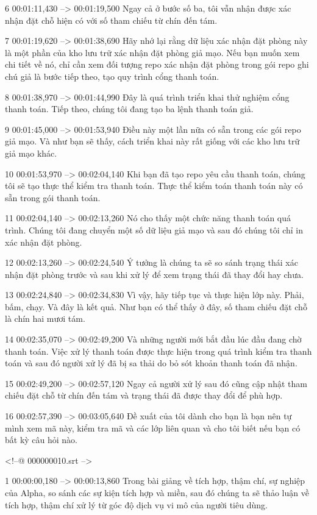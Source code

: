 6
00:01:11,430 --> 00:01:19,500
Ngay cả ở bước số ba, tôi vẫn nhận được xác nhận đặt chỗ hiện có với số tham chiếu từ chín đến tám.

7
00:01:19,620 --> 00:01:38,690
Hãy nhớ lại rằng dữ liệu xác nhận đặt phòng này là một phần của kho lưu trữ xác nhận đặt phòng giả mạo.  Nếu bạn muốn xem chi tiết về nó, chỉ cần xem đối tượng repo xác nhận đặt phòng trong gói repo ghi chú giả là bước tiếp theo, tạo quy trình cổng thanh toán.

8
00:01:38,970 --> 00:01:44,990
Đây là quá trình triển khai thử nghiệm cổng thanh toán.  Tiếp theo, chúng tôi đang tạo ba lệnh thanh toán giả.

9
00:01:45,000 --> 00:01:53,940
Điều này một lần nữa có sẵn trong các gói repo giả mạo.  Và như bạn sẽ thấy, cách triển khai này rất giống với các kho lưu trữ giả mạo khác.

10
00:01:53,970 --> 00:02:04,140
Khi bạn đã tạo repo yêu cầu thanh toán, chúng tôi sẽ tạo thực thể kiểm tra thanh toán.  Thực thể kiểm toán thanh toán này có sẵn trong gói thanh toán.

11
00:02:04,140 --> 00:02:13,260
Nó cho thấy một chức năng thanh toán quá trình.  Chúng tôi đang chuyển một số dữ liệu giả mạo và sau đó chúng tôi chỉ in xác nhận đặt phòng.

12
00:02:13,260 --> 00:02:24,540
Ý tưởng là chúng ta sẽ so sánh trạng thái xác nhận đặt phòng trước và sau khi xử lý để xem trạng thái đã thay đổi hay chưa.

13
00:02:24,840 --> 00:02:34,830
Vì vậy, hãy tiếp tục và thực hiện lớp này.  Phải, bấm, chạy.  Và đây là kết quả.  Như bạn có thể thấy ở đây, số tham chiếu đặt chỗ là chín hai mươi tám.

14
00:02:35,070 --> 00:02:49,200
Và những người mới bắt đầu lúc đầu đang chờ thanh toán.  Việc xử lý thanh toán được thực hiện trong quá trình kiểm tra thanh toán và sau đó người xử lý đã bị sa thải do bỏ sót khoản thanh toán đã nhận.

15
00:02:49,200 --> 00:02:57,120
Ngay cả người xử lý sau đó cũng cập nhật tham chiếu đặt chỗ từ chín đến tám và trạng thái đã được thay đổi để phù hợp.

16
00:02:57,390 --> 00:03:05,640
Đề xuất của tôi dành cho bạn là bạn nên tự mình xem mã này, kiểm tra mã và các lớp liên quan và cho tôi biết nếu bạn có bất kỳ câu hỏi nào.

<!--@ 000000010.srt -->

1
00:00:00,180 --> 00:00:13,860
Trong bài giảng về tích hợp, thậm chí, sự nghiệp của Alpha, so sánh các sự kiện tích hợp và miền, sau đó chúng ta sẽ thảo luận về tích hợp, thậm chí xử lý từ góc độ dịch vụ vi mô của người tiêu dùng.

